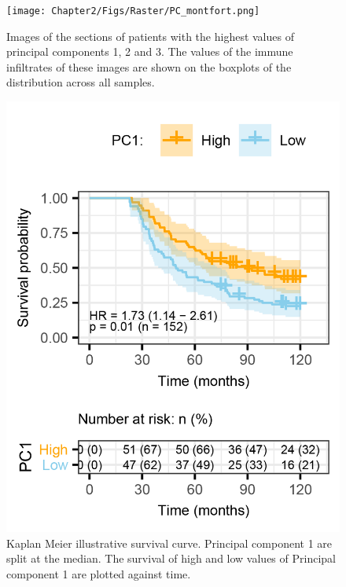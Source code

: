\begin{landscape}
\begin{figure}[width=0.8\textwidth, keepaspectratio]
    \centering
    \texttt{[image: Chapter2/Figs/Raster/PC\_montfort.png]}
    \caption[Examples of tissue sections with largest values of principal components.]{Images of the sections of patients with the highest values of principal components 1, 2 and 3. The values of the immune infiltrates of these images are shown on the boxplots of the distribution across all samples.}
    \label{fig:PC_examples}
\end{figure}
\end{landscape}

\begin{figure}
    \centering
    \includegraphics{Chapter2/Figs/Raster/Montfort-2018_Fig7A-PC1.png}
    \caption[Kaplan Meier Curves for Principal Component 1]{Kaplan Meier illustrative survival curve. Principal component 1 are split at the median. The survival of high and low values of Principal component 1 are plotted against time. }
    \label{fig:km_PC}
\end{figure}

